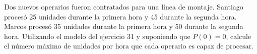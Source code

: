 \item Dos nuevos operarios fueron contratados para una línea de montaje. Santiago procesó 25 unidades durante la primera hora y 45 durante la segunda hora. Marcos procesó 35 unidades durante la primera hora y 50 durante la segunda hora. Utilizando el modelo del ejercicio 31 y suponiendo que $P(0) = 0$, calcule el número máximo de unidades por hora que cada operario es capaz de procesar.
